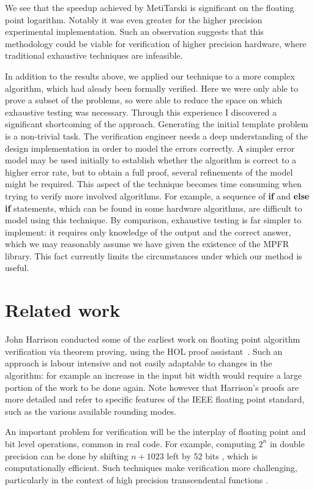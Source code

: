 \documentclass[a4]{article}
\begin{document}
We see that the speedup achieved by MetiTarski is significant on the floating point logarithm. Notably it was even greater for the higher precision experimental implementation. Such an observation suggests that this methodology could be viable for verification of higher precision hardware, where traditional exhaustive techniques are infeasible. 

In addition to the results above, we applied our technique to a more complex algorithm, which had aleady been formally verified. Here we were only able to prove a subset of the problems, so were able to reduce the space on which exhaustive testing was necessary. Through this experience I discovered a significant shortcoming of the approach. Generating the initial template problem is a non-trivial task. The verification engineer needs a deep understanding of the design implementation in order to model the errors correctly. A simpler error model may be used initially to establish whether the algorithm is correct to a higher error rate, but to obtain a full proof, several refinements of the model might be required. This aspect of the technique becomes time consuming when trying to verify more involved algorithms. For example, a sequence of \textbf{if} and \textbf{else if} statements, which can be found in some hardware algorithms, are difficult to model using this technique. By comparison, exhaustive testing is far simpler to implement: it requires only knowledge of the output and the correct answer, which we may reasonably assume we have given the existence of the MPFR library. This fact currently limits the circumstances under which our method is useful. 
 
\section{Related work}
John Harrison conducted some of the earliest work on floating point algorithm verification via theorem proving, using the HOL proof assistant~\cite{harrison1997floating}. Such an approach is labour intensive and not easily adaptable to changes in the algorithm: for example an increase in the input bit width would require a large portion of the work to be done again. Note however that Harrison's proofs are more detailed and refer to specific features of the IEEE floating point standard, such as the various available rounding modes. 

An important problem for verification will be the interplay of floating point and bit level operations, common in real code. For example, computing $2^n$ in double precision can be done by shifting $n+1023$ left by 52 bits \cite{mine2012abstract}, which is computationally efficient. Such techniques make verification more challenging, particularly in the context of high precision transcendental functions \cite{lee2016verifying}. 
\end{document}
